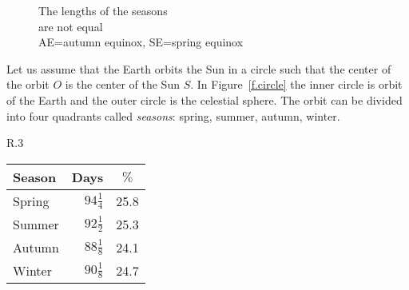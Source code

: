\begin{figure}[b]
\begin{minipage}{.48\textwidth}
\begin{center}
\caption{The lengths of the seasons\\are not equal\\
\textsf{\small AE=autumn equinox}, \textsf{\small SE=spring equinox}}\label{f.seasons}
\end{center}
\end{minipage}
\end{figure}

Let us assume that the Earth orbits the Sun in a circle such that the center of the orbit $O$ is the center of the Sun $S$. In Figure~\ref{f.circle} the inner circle is orbit of the Earth and the outer circle is the celestial sphere. The orbit can be divided into four quadrants called \emph{seasons}: spring, summer, autumn, winter.

\begin{wrapfigure}{R}{.3\textwidth}
\begin{sffamily}
\renewcommand{\arraystretch}{1.3}
\vspace*{-2ex}
\begin{tabular}{|l|r|r|}
\hline
Season & \multicolumn{1}{|c|}{Days}&\multicolumn{1}{|c|}{$\%$}\\\hline\hline
Spring & $94\frac{1}{4}$ & 25.8\\\hline
Summer & $92\frac{1}{2}$ & 25.3\\\hline
Autumn & $88\frac{1}{8}$ & 24.1\\\hline
Winter & $90\frac{1}{8}$ & 24.7\\\hline
\end{tabular}
\end{sffamily}
\end{wrapfigure}

